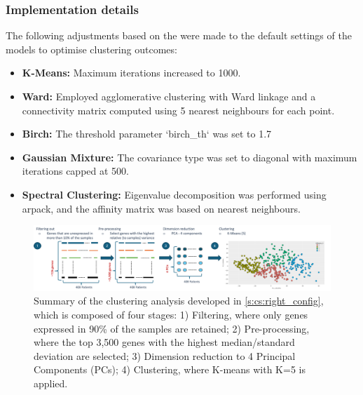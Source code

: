 \subsubsection*{Implementation details}
The following adjustments based on the \citet{Scikit-learn_undated-ax} were made to the default settings of the models to optimise clustering outcomes:
\begin{itemize}
    \item \textbf{K-Means:} Maximum iterations increased to 1000.
    \item \textbf{Ward:} Employed agglomerative clustering with Ward linkage and a connectivity matrix computed using 5 nearest neighbours for each point.
    \item \textbf{Birch:} The threshold parameter `birch\_th` was set to 1.7
    \item \textbf{Gaussian Mixture:} The covariance type was set to diagonal with maximum iterations capped at 500.
    \item \textbf{Spectral Clustering:} Eigenvalue decomposition was performed using arpack, and the affinity matrix was based on nearest neighbours.
\end{itemize}

\begin{figure}
    \centering
    \includegraphics[width=1.0\textwidth,height=1.0\textheight,keepaspectratio]{Sections/ClusteringAnalysis/Resources/clustering_pipeline.png}
    \caption[Clustering analysis pipeline]{Summary of the clustering analysis developed in \cref{s:cs:right_config}, which is composed of four stages: 1) Filtering, where only genes expressed in 90\% of the samples are retained; 2) Pre-processing, where the top 3,500 genes with the highest median/standard deviation are selected; 3) Dimension reduction to 4 Principal Components (PCs); 4) Clustering, where K-means with K=5 is applied.}
    \label{fig:cs:clustering_pipeline}
\end{figure}
